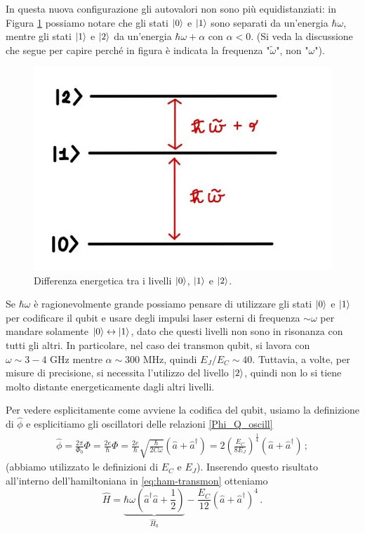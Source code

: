 \noindent In questa nuova configurazione gli autovalori non sono più equidistanziati: in Figura \ref{fig:energy-difference-transmon} possiamo notare che gli stati $\ket 0$ e $\ket 1$ sono separati da un'energia $\hbar\omega$, mentre gli stati $\ket 1$ e $\ket 2$ da un'energia $\hbar\omega+\alpha$ con $\alpha<0$. (Si veda la discussione che segue per capire perché in figura è indicata la frequenza "$\tilde{\omega}$", non "$\omega$"). 

\begin{figure}[H]
	\centering	
	\includegraphics[scale=.45, keepaspectratio]{images/energy-difference-transmon.jpg}
	\caption{Differenza energetica tra i livelli $\ket 0$, $\ket 1$ e $\ket 2$.}
	\label{fig:energy-difference-transmon}
\end{figure}

\noindent Se $\hbar \omega$ è ragionevolmente grande possiamo pensare di utilizzare gli stati $\ket{0}$ e $\ket{1}$ per codificare il qubit e usare degli impulsi laser esterni di frequenza $\sim \omega$ per mandare solamente $\ket{0} \leftrightarrow \ket{1}$, dato che questi livelli non sono in risonanza con tutti gli altri. In particolare, nel caso dei transmon qubit, si lavora con $\omega \sim 3-4 \text{ GHz}$ mentre $\alpha \sim 300 \text{ MHz}$, quindi $E_J/E_C \sim 40$. Tuttavia, a volte, per misure di precisione, si necessita l'utilizzo del livello $\ket 2$, quindi non lo si tiene molto distante energeticamente dagli altri livelli.

\noindent Per vedere esplicitamente come avviene la codifica del qubit, usiamo la definizione di $\hat \phi$ e esplicitiamo gli oscillatori delle relazioni \eqref{Phi_Q_oscill}
\begin{align*}
    \hat \phi = \frac{2\pi}{\Phi_0}\Phi = \frac{2e}{\hbar}\Phi = \frac{2e}{\hbar}\sqrt{\frac{\hbar}{2C\omega}}\left(\hat a + \hat a^\dagger\right) = 2\left(\frac{E_C}{8E_J}\right)^{\frac 14}\left(\hat a + \hat a^\dagger\right) \, ;
\end{align*}
(abbiamo utilizzato le definizioni di $E_C$ e $E_J$). Inserendo questo risultato all'interno dell'hamiltoniana in \eqref{eq:ham-transmon} otteniamo
\begin{equation}\label{H_sviluppare_quartico}
    \hat H = \underbrace{\hbar\omega\left(\hat a^\dagger\hat a+\frac 12\right)}_{\hat{H}_0}-\frac{E_C}{12}\left(\hat a + \hat a^\dagger\right)^4 \, .
\end{equation}

